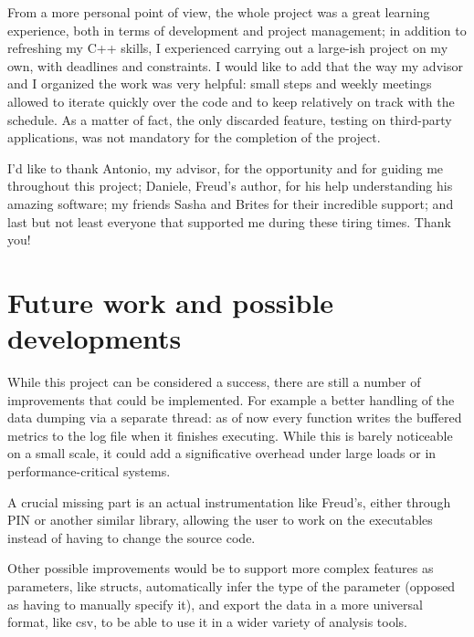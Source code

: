     From a more personal point of view, the whole project was a great learning experience, both
    in terms of development and project management; in addition to refreshing my C++ skills, I
    experienced carrying out a large-ish project on my own, with deadlines and constraints.
    I would like to add that the way my advisor and I organized the work was very helpful: small
    steps and weekly meetings allowed to iterate quickly over the code and to keep 
    relatively on track with the schedule. As a matter of fact, the only discarded feature,
    testing on third-party applications, was not mandatory for the completion of the project.

    I'd like to thank Antonio, my advisor, for the opportunity and for guiding me throughout
    this project; Daniele, Freud's author, for his help understanding his amazing software;
    my friends Sasha and Brites for their incredible support;
    and last but not least everyone that supported me during these tiring times. Thank you!


	\section{Future work and possible developments}

        While this project can be considered a success, there are still a number of improvements
        that could be implemented. For example a better handling of the data dumping via a separate thread:
        as of now every function writes the buffered metrics to the log file when it finishes executing. While this
        is barely noticeable on a small scale, it could add a significative overhead under large loads
        or in performance-critical systems.

        A crucial missing part is an actual instrumentation like Freud's, either through PIN or another
        similar library, allowing the user to work on the executables instead of having to change the source code.

        Other possible improvements would be to support more complex features as parameters, like structs,
        automatically infer the type of the parameter (opposed as having to manually specify it), and
        export the data in a more universal format, like csv, to be able to use it in a wider variety of
        analysis tools.

